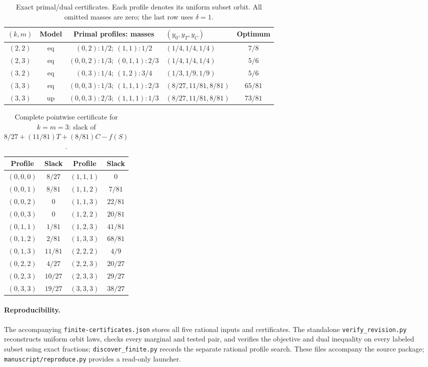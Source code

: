 \begin{table}[!htbp]
\centering
\caption{Exact primal/dual certificates. Each profile denotes its uniform
subset orbit. All omitted masses are zero; the last row uses \(\delta=1\).}
\label{tab:certificates}
\begin{tabular}{ccclc}
\toprule
\((k,m)\)&Model&Primal profiles: masses&\((y_0,y_T,y_C)\)&Optimum\\
\midrule
\((2,2)\)&eq&\((0,2):1/2;\ (1,1):1/2\)&\((1/4,1/4,1/4)\)&\(7/8\)\\
\((2,3)\)&eq&\((0,0,2):1/3;\ (0,1,1):2/3\)&\((1/4,1/4,1/4)\)&\(5/6\)\\
\((3,2)\)&eq&\((0,3):1/4;\ (1,2):3/4\)&\((1/3,1/9,1/9)\)&\(5/6\)\\
\((3,3)\)&eq&\((0,0,3):1/3;\ (1,1,1):2/3\)&\((8/27,11/81,8/81)\)&\(65/81\)\\
\((3,3)\)&up&\((0,0,3):2/3;\ (1,1,1):1/3\)&\((8/27,11/81,8/81)\)&\(73/81\)\\
\bottomrule
\end{tabular}
\end{table}

\begin{table}[!htbp]
\centering
\caption{Complete pointwise certificate for \(k=m=3\): slack of
\(8/27+(11/81)T+(8/81)C-f(S)\).}
\label{tab:slack}
\begin{tabular}{cc@{\qquad}cc}
\toprule
Profile&Slack&Profile&Slack\\
\midrule
\((0,0,0)\)&\(8/27\)&\((1,1,1)\)&\(0\)\\
\((0,0,1)\)&\(8/81\)&\((1,1,2)\)&\(7/81\)\\
\((0,0,2)\)&\(0\)&\((1,1,3)\)&\(22/81\)\\
\((0,0,3)\)&\(0\)&\((1,2,2)\)&\(20/81\)\\
\((0,1,1)\)&\(1/81\)&\((1,2,3)\)&\(41/81\)\\
\((0,1,2)\)&\(2/81\)&\((1,3,3)\)&\(68/81\)\\
\((0,1,3)\)&\(11/81\)&\((2,2,2)\)&\(4/9\)\\
\((0,2,2)\)&\(4/27\)&\((2,2,3)\)&\(20/27\)\\
\((0,2,3)\)&\(10/27\)&\((2,3,3)\)&\(29/27\)\\
\((0,3,3)\)&\(19/27\)&\((3,3,3)\)&\(38/27\)\\
\bottomrule
\end{tabular}
\end{table}

\paragraph{Reproducibility.}
The accompanying \texttt{finite-certificates.json} stores all five rational
inputs and certificates. The standalone \texttt{verify\_revision.py}
reconstructs uniform orbit laws, checks every marginal and tested pair,
and verifies the objective and dual inequality on every labeled subset
using exact fractions; \texttt{discover\_finite.py} records the separate
rational profile search. These files accompany the source package; \texttt{manuscript/reproduce.py}
provides a read-only launcher.

